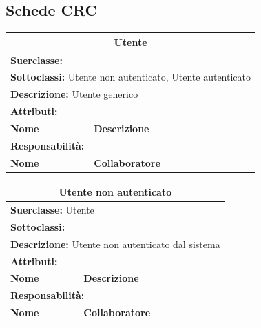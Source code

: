 \documentclass[11pt]{article}
\begin{document}
\subsection{Schede CRC}

\begin{table}[H]
\centering
\begin{tabularx}{1\textwidth}{|X|X|}
\hline
\multicolumn{2}{|c|}{\textbf{Utente}}\\\hline
\multicolumn{2}{|l|}{\textbf{Suerclasse:}}\\\hline
\multicolumn{2}{|l|}{\textbf{Sottoclassi:} Utente non autenticato, Utente autenticato}\\\hline
\multicolumn{2}{|l|}{\textbf{Descrizione:} Utente generico}\\\hline
\multicolumn{2}{|l|}{\textbf{Attributi:}}\\
\textbf{Nome} & \textbf{Descrizione}\\\hline
\multicolumn{2}{|l|}{\textbf{Responsabilità:}}\\
\textbf{Nome} & \textbf{Collaboratore}\\\hline
\end{tabularx}
\end{table}


\begin{table}[H]
\centering
\begin{tabularx}{1\textwidth}{|X|X|}\hline
\multicolumn{2}{|c|}{\textbf{Utente non autenticato}}\\\hline
\multicolumn{2}{|l|}{\textbf{Suerclasse:} Utente}\\\hline
\multicolumn{2}{|l|}{\textbf{Sottoclassi:} }\\\hline
\multicolumn{2}{|l|}{\textbf{Descrizione:} Utente non autenticato dal sistema}\\\hline
\multicolumn{2}{|l|}{\textbf{Attributi:}}\\
\textbf{Nome} & \textbf{Descrizione}\\

\hline
\multicolumn{2}{|l|}{\textbf{Responsabilità:}}\\
\textbf{Nome} & \textbf{Collaboratore}\\

\hline
\end{tabularx}
\end{table}
\end{document}
